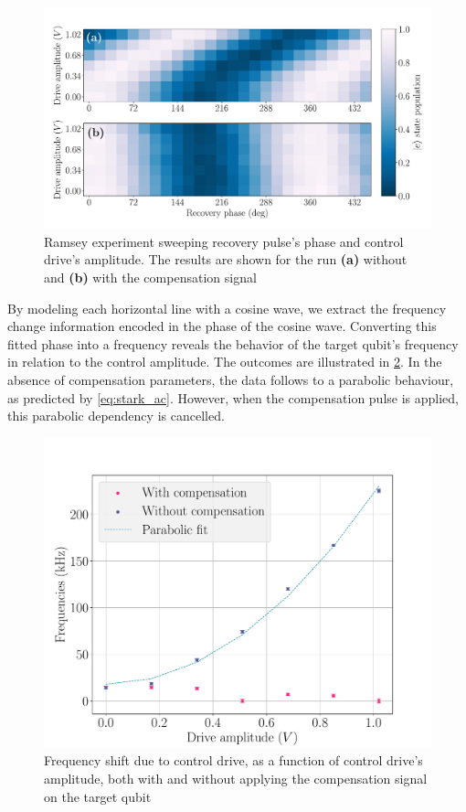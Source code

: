 \begin{figure}
    \centering
    \includegraphics[width=1\linewidth]{Images/Chap2.0/Ramsey_cancellatoin.pdf}
    \caption{Ramsey experiment sweeping recovery pulse's phase and control drive's amplitude. The results are shown for the  run \textbf{(a)} without and \textbf{(b)} with the compensation signal}
    \label{fig:Ramsey_cancellation}
\end{figure}

By modeling each horizontal line with a cosine wave, we extract the frequency change information encoded in the phase of the cosine wave.
Converting this fitted phase into a frequency reveals the behavior of the target qubit's frequency in relation to the control amplitude.
The outcomes are illustrated in \cref{fig:Ramsey_freq}.
In the absence of compensation parameters, the data follows to a parabolic behaviour, as predicted by \cref{eq:stark_ac}.
However, when the compensation pulse is applied, this parabolic dependency is cancelled.

\begin{figure}
    \centering
    \includegraphics[width=0.75\linewidth]{Images//Chap2.0/frequencies.pdf}
    \caption{Frequency shift due to control drive, as a function of control drive's amplitude, both with and without applying the compensation signal on the target qubit}
    \label{fig:Ramsey_freq}
\end{figure}

